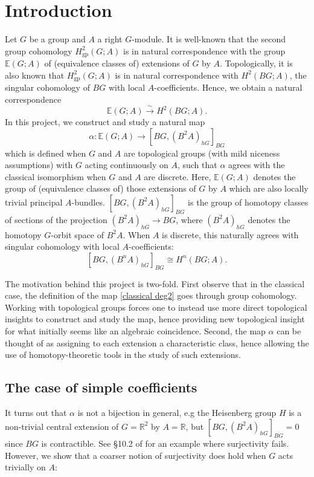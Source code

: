 \documentclass[12 pt]{article}
\title{}
\date{}
\theoremstyle{definition}
\newcommand{\R}{\mathbb{R}}
\newcommand{\E}{\mathbb{E}}
\newcommand{\iso}{\xrightarrow{\sim}}
\newcommand{\Hgp}[1]{H_{\text{gp}}^{#1}}
\begin{document}
\section{Introduction}

Let $G$ be a group and $A$ a right $G$-module. It is well-known that the second group cohomology $\Hgp2(G;A)$ is in natural correspondence with the group $\E(G;A)$ of (equivalence classes of) extensions of $G$ by $A$. Topologically, it is also known that $\Hgp2(G;A)$ is in natural correspondence with $H^2(BG;A)$, the singular cohomology of $BG$ with local $A$-coefficients. Hence, we obtain a natural correspondence
\begin{equation}\label{classical deg2}
\E(G;A)\iso H^2(BG;A).
\end{equation}
In this project, we construct and study a natural map
$$\alpha:\E(G;A)\to [BG,(B^2A)_{hG}]_{BG}$$
which is defined when $G$ and $A$ are topological groups (with mild niceness assumptions) with $G$ acting continuously on $A$, such that $\alpha$ agrees with the classical isomorphism when $G$ and $A$ are discrete. Here, $\E(G;A)$ denotes the group of (equivalence classes of) those extensions of $G$ by $A$ which are also locally trivial principal $A$-bundles. $[BG,(B^2A)_{hG}]_{BG}$ is the group of homotopy classes of sections of the projection $(B^2A)_{hG}\to BG$, where $(B^2A)_{hG}$ denotes the homotopy $G$-orbit space of $B^2A$. When $A$ is discrete, this naturally agrees with singular cohomology with local $A$-coefficients:
$$[BG,(B^nA)_{hG}]_{BG}\cong H^n(BG;A).$$

The motivation behind this project is two-fold. First observe that in the classical case, the definition of the map \eqref{classical deg2} goes through group cohomology. Working with topological groups forces one to instead use more direct topological insights to construct and study the map, hence providing new topological insight for what initially seems like an algebraic coincidence. Second, the map $\alpha$ can be thought of as assigning to each extension a characteristic class, hence allowing the use of homotopy-theoretic tools in the study of such extensions.

\subsection{The case of simple coefficients}

It turns out that $\alpha$ is not a bijection in general, e.g the Heisenberg group $H$ is a non-trivial central extension of $G=\R^2$ by $A=\R$, but $[BG,(B^2A)_{hG}]_{BG}=0$ since $BG$ is contractible. See \S10.2 of \cite{Ja} for an example where surjectivity fails. However, we show that a coarser notion of surjectivity does hold when $G$ acts trivially on $A$:
\end{document}
